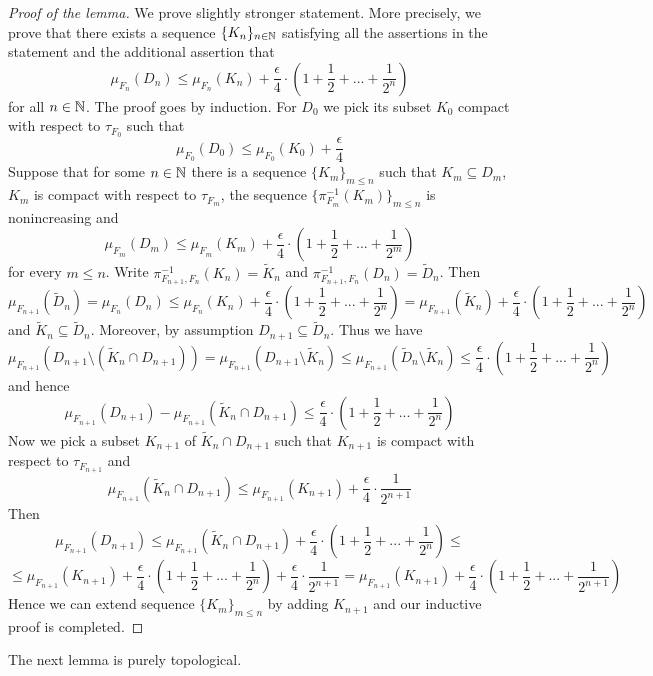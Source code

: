 \documentclass[10pt]{amsart}
\begin{document}
\begin{proof}[Proof of the lemma]
	We prove slightly stronger statement. More precisely, we prove that there exists a sequence $\{K_n\}_{n\in {\mathbb N}}$ satisfying all the assertions in the statement and the additional assertion that
	$$\mu_{F_n}(D_n)\leq \mu_{F_n}(K_n) + \frac{\epsilon}{4}\cdot \left(1 + \frac{1}{2} + ... + \frac{1}{2^n}\right)$$
	for all $n\in {\mathbb N}$. The proof goes by induction. For $D_0$ we pick its subset $K_0$ compact with respect to $\tau_{F_0}$ such that
	$$\mu_{F_0}(D_0) \leq \mu_{F_0}(K_0) + \frac{\epsilon}{4}$$
	Suppose that for some $n\in {\mathbb N}$ there is a sequence $\{K_m\}_{m\leq n}$ such that $K_m\subseteq D_m$, $K_m$ is compact with respect to $\tau_{F_{m}}$, the sequence $\{\pi^{-1}_{F_m}(K_m)\}_{m\leq n}$ is nonincreasing and
	$$\mu_{F_m}(D_m)\leq \mu_{F_m}(K_m) + \frac{\epsilon}{4}\cdot \left(1 + \frac{1}{2} + ... + \frac{1}{2^m}\right)$$
	for every $m\leq n$. Write $\pi_{F_{n+1},F_n}^{-1}(K_n) = \tilde{K}_n$ and $\pi_{F_{n+1},F_n}^{-1}(D_n) = \tilde{D}_n$. Then
	$$\mu_{F_{n+1}}(\tilde{D}_n) = \mu_{F_n}(D_n) \leq \mu_{F_n}(K_n) + \frac{\epsilon}{4}\cdot \left(1 + \frac{1}{2} + ... + \frac{1}{2^n}\right) = \mu_{F_{n+1}}(\tilde{K}_n) + \frac{\epsilon}{4}\cdot \left(1 + \frac{1}{2} + ... + \frac{1}{2^n}\right)$$
	and $\tilde{K}_n \subseteq \tilde{D}_n$. Moreover, by assumption $D_{n+1}\subseteq \tilde{D}_n$. Thus we have
	$$\mu_{F_{n+1}}\left(D_{n+1} \setminus (\tilde{K}_{n}\cap D_{n+1})\right) = \mu_{F_{n+1}}(D_{n+1} \setminus \tilde{K}_{n}) \leq \mu_{F_{n+1}}(\tilde{D}_{n} \setminus \tilde{K}_{n}) \leq \frac{\epsilon}{4}\cdot \left(1 + \frac{1}{2} + ... + \frac{1}{2^n}\right)$$
	and hence
	$$\mu_{F_{n+1}}\left(D_{n+1}\right) - \mu_{F_{n+1}}\left(\tilde{K}_{n}\cap D_{n+1}\right) \leq \frac{\epsilon}{4}\cdot \left(1 + \frac{1}{2} + ... + \frac{1}{2^n}\right)$$
	Now we pick a subset $K_{n+1}$ of $\tilde{K}_{n}\cap D_{n+1}$ such that $K_{n+1}$ is compact with respect to $\tau_{F_{n+1}}$ and
	$$\mu_{F_{n+1}}(\tilde{K}_{n}\cap D_{n+1}) \leq \mu_{F_{n+1}}(K_{n+1}) + \frac{\epsilon}{4}\cdot \frac{1}{2^{n+1}}$$
	Then
	$$\mu_{F_{n+1}}\left(D_{n+1}\right) \leq \mu_{F_{n+1}}\left(\tilde{K}_{n}\cap D_{n+1}\right) + \frac{\epsilon}{4}\cdot \left(1 + \frac{1}{2} + ... + \frac{1}{2^n}\right) \leq $$
	$$\leq \mu_{F_{n+1}}(K_{n+1}) + \frac{\epsilon}{4}\cdot \left(1 + \frac{1}{2} + ... + \frac{1}{2^n}\right) + \frac{\epsilon}{4}\cdot \frac{1}{2^{n+1}} = \mu_{F_{n+1}}(K_{n+1}) + \frac{\epsilon}{4}\cdot \left(1 + \frac{1}{2} + ... + \frac{1}{2^{n+1}}\right)$$
	Hence we can extend sequence $\{K_m\}_{m\leq n}$ by adding $K_{n+1}$ and our inductive proof is completed.
\end{proof}
\noindent
The next lemma is purely topological.
\end{document}
